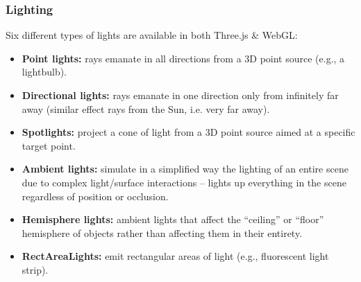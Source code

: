 \documentclass[a4paper,11pt]{article}
\begin{document}
\subsubsection{Lighting}
Six different types of lights are available in both Three.js \& WebGL:
\begin{itemize}
    \item   \textbf{Point lights:} rays emanate in all directions from a 3D point source (e.g., a lightbulb).
    \item   \textbf{Directional lights:} rays emanate in one direction only from infinitely far away
            (similar effect rays from the Sun, i.e. very far away).
    \item   \textbf{Spotlights:} project a cone of light from a 3D point source aimed at a specific target point.
    \item   \textbf{Ambient lights:} simulate in a simplified way the lighting of an entire scene due to complex 
            light/surface interactions -- lights up everything in the scene regardless of position or occlusion.
    \item   \textbf{Hemisphere lights:} ambient lights that affect the ``ceiling'' or ``floor'' hemisphere of objects
            rather than affecting them in their entirety.
    \item   \textbf{RectAreaLights:} emit rectangular areas of light (e.g., fluorescent light strip).
\end{itemize}
\end{document}

